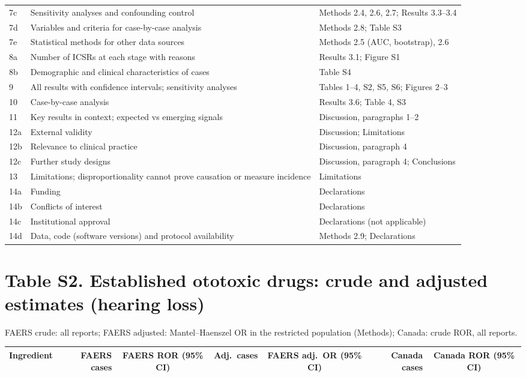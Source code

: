\documentclass[10pt]{article}
\begin{document}
{\begin{longtable}{p{1cm}p{12cm}p{8cm}}
7c & Sensitivity analyses and confounding control & Methods 2.4, 2.6, 2.7; Results 3.3--3.4 \\
7d & Variables and criteria for case-by-case analysis & Methods 2.8; Table S3 \\
7e & Statistical methods for other data sources & Methods 2.5 (AUC, bootstrap), 2.6 \\
8a & Number of ICSRs at each stage with reasons & Results 3.1; Figure S1 \\
8b & Demographic and clinical characteristics of cases & Table S4 \\
9 & All results with confidence intervals; sensitivity analyses & Tables 1--4, S2, S5, S6; Figures 2--3 \\
10 & Case-by-case analysis & Results 3.6; Table 4, S3 \\
11 & Key results in context; expected vs emerging signals & Discussion, paragraphs 1--2 \\
12a & External validity & Discussion; Limitations \\
12b & Relevance to clinical practice & Discussion, paragraph 4 \\
12c & Further study designs & Discussion, paragraph 4; Conclusions \\
13 & Limitations; disproportionality cannot prove causation or measure incidence & Limitations \\
14a & Funding & Declarations \\
14b & Conflicts of interest & Declarations \\
14c & Institutional approval & Declarations (not applicable) \\
14d & Data, code (software versions) and protocol availability & Methods 2.9; Declarations \\
\bottomrule
\end{longtable}}

\section*{Table S2. Established ototoxic drugs: crude and adjusted estimates (hearing loss)}
FAERS crude: all reports; FAERS adjusted: Mantel--Haenszel OR in the restricted population (Methods); Canada: crude ROR, all reports.
\begin{longtable}{lrcrcrc}
\toprule
Ingredient & FAERS cases & FAERS ROR (95\% CI) & Adj.\ cases & FAERS adj.\ OR (95\% CI) & Canada cases & Canada ROR (95\% CI) \\
\midrule
\bottomrule
\end{longtable}
\end{document}
